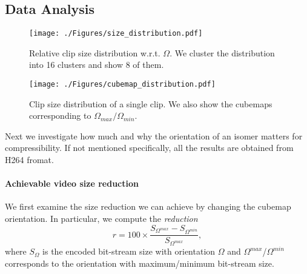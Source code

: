 \documentclass[journal,transmag]{IEEEtran}
\begin{document}
\subsection{Data Analysis}
\label{sub:data_analysis}

\begin{figure}[t]
    \center
    \texttt{[image: ./Figures/size\_distribution.pdf]}
    \caption{
        \label{fig:size_distribution}
        Relative clip size distribution w.r.t. $\Omega$.
        We cluster the distribution into 16 clusters and show 8 of them.
    }
\end{figure}\begin{figure}[t]
    \centering
    \texttt{[image: ./Figures/cubemap\_distribution.pdf]}
    \caption{
        Clip size distribution of a single clip.
        We also show the cubemaps corresponding to $\Omega_{max}/\Omega_{min}$.
    }
    \label{fig:example_cube}
\end{figure}

Next we investigate how much and why the orientation of an isomer matters for compressibility.
If not mentioned specifically, all the results are obtained from H264 fromat.

\paragraph{Achievable video size reduction}
We first examine the size reduction we can achieve by changing the cubemap orientation.
In particular, we compute the \emph{reduction}\begin{equation}
    r = 100 \times \frac{S_{\Omega^{max}}-S_{\Omega^{min}}}{S_{\Omega^{max}}},
\end{equation}
where $S_{\Omega}$ is the encoded bit-stream size with orientation $\Omega$ and $\Omega^{max}$/$\Omega^{min}$ corresponds to the orientation with maximum/minimum bit-stream size.
\end{document}
